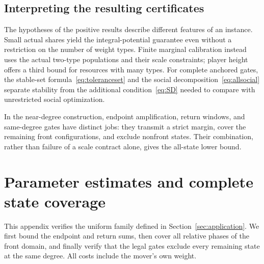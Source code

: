 \documentclass[manuscript,review,anonymous]{acmart}
\begin{document}
\subsection{Interpreting the resulting certificates}
The hypotheses of the positive results describe different features of an instance.\label{sec:conclusion}
Small actual shares yield the integral-potential guarantee even without a restriction on the number of weight types. Finite marginal calibration instead uses the actual two-type populations and their scale constraints; player height offers a third bound for resources with many types. For complete anchored gates, the stable-set formula~\eqref{eq:toleranceset} and the social decomposition~\eqref{eq:allsocial} separate stability from the additional condition~\eqref{eq:SD} needed to compare with unrestricted social optimization.

In the near-degree construction, endpoint amplification, return windows, and same-degree gates have distinct jobs: they transmit a strict margin, cover the remaining front configurations, and exclude nonfront states. Their combination, rather than failure of a scale contract alone, gives the all-state lower bound.

\appendix
\section{Parameter estimates and complete state coverage}\label{app:construction}
This appendix verifies the uniform family defined in Section~\ref{sec:application}. We first bound the endpoint and return sums, then cover all relative phases of the front domain, and finally verify that the legal gates exclude every remaining state at the same degree. All costs include the mover's own weight.
\end{document}
